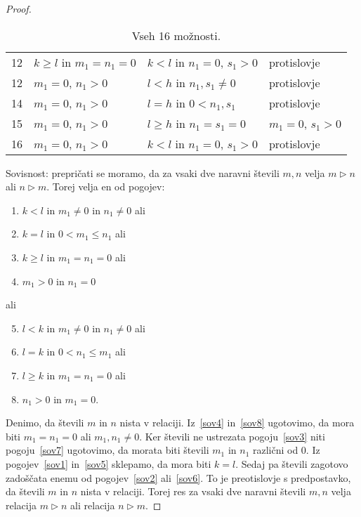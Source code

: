 \documentclass[../TG_magistrsko_delo_sections.tex]{subfiles}
\begin{document}
\begin{proof}
\begin{table}[h!]
\begin{tabular}{||c | l | l | l||}
 12 & $k \geq l$ in $m_1 = n_1 = 0$ & $k<l$ in $n_1 = 0$, $s_1 > 0$ & protislovje \\
 12 & $m_1 = 0$, $n_1 > 0$ & $l<h$ in $n_1, s_1 \neq 0$ & protislovje \\ 
 14 & $m_1 = 0$, $n_1 > 0$ & $l=h$ in $0<n_1, s_1$ & protislovje \\
 15 & $m_1 = 0$, $n_1 > 0$ & $l \geq h$ in $n_1 = s_1 = 0$ & $m_1 = 0$, $s_1 > 0$ \\
 16 & $m_1 = 0$, $n_1 > 0$ & $k<l$ in $n_1 = 0$, $s_1 > 0$ & protislovje \\[1ex] 
 \hline
\end{tabular}
\caption{Vseh 16 možnosti.}
\label{table:1}
\end{table}

Sovisnost: prepričati se moramo, da za vsaki dve naravni števili $m, n$ velja $m \triangleright n$ ali $n \triangleright m$. Torej velja en od pogojev:
\begin{enumerate}[label={(\roman*)}]
\item $k<l$ in $m_1 \neq 0$ in $n_1 \neq 0$ ali \label{sov1}
\item $k=l$ in $0<m_1 \leq n_1$ ali \label{sov2}
\item $k \geq l$ in $m_1 = n_1=0$ ali \label{sov3}
\item $m_1>0$ in $n_1 =0$ \label{sov4}
\end{enumerate}
ali 
\begin{enumerate}[label={(\roman*)}]
\setcounter{enumi}{4}
\item $l<k$ in $m_1 \neq 0$ in $n_1 \neq 0$ ali \label{sov5}
\item $l=k$ in $0<n_1 \leq m_1$ ali \label{sov6}
\item $l \geq k$ in $m_1 = n_1=0$ ali \label{sov7}
\item $n_1>0$ in $m_1 =0$. \label{sov8}
\end{enumerate}
Denimo, da števili $m$ in $n$ nista v relaciji. Iz~\ref{sov4} in~\ref{sov8} ugotovimo, da mora biti $m_1 = n_1 = 0$ ali $m_1, n_1 \neq 0$. Ker števili ne ustrezata pogoju~\ref{sov3} niti pogoju~\ref{sov7} ugotovimo, da morata biti števili $m_1$ in $n_1$ različni od 0. Iz pogojev~\ref{sov1} in~\ref{sov5} sklepamo, da mora biti $k=l$. Sedaj pa števili zagotovo zadoščata enemu od pogojev~\ref{sov2} ali~\ref{sov6}. To je preotislovje s predpostavko, da števili $m$ in $n$ nista v relaciji. Torej res za vsaki dve naravni števili $m, n$ velja relacija $m \triangleright n$ ali relacija $n \triangleright m$. 
\end{proof}
\end{document}
